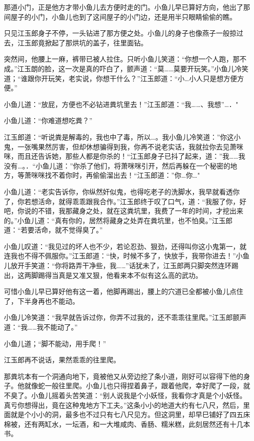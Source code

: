 \documentclass[12pt,oneside]{book}
\begin{document}
那道小门，正是他方才带小鱼儿去方便时走的门。小鱼儿早已算好方向，他出了那间屋子的小门，小鱼儿也到了这间屋子的小门边，还是用半只眼睛偷偷的瞧。

只见江玉郎身子不停，一头钻进了那方便之处。小鱼儿的身子也像燕子一般掠过去，江玉郎竟掀起了那烘坑的盖子，往里面钻。

突然间，他腰上一麻，裤带已被人拉住。只听小鱼儿笑道：``你想一个人跑，那不成。''江玉朗的脸，这一次是真的吓白了，颤声道：``莫\ldots\ldots 莫要开玩笑。''小鱼儿冷笑道；``谁跟你开玩笑，老实说，你想干什么？''江玉郎道：``小\ldots 小人只是想方便方便。''

小鱼儿道：``放屁，方便也不必钻进粪坑里去！''江玉郎道：``我\ldots\ldots、我想''\ldots．"

小鱼儿道：``你难道想吃粪？''

江玉郎道：``听说粪是解毒的，我也中了毒，所以\ldots。我小鱼儿冷笑道：''你这小鬼，一张嘴果然厉害，但却休想骗得到我，你再不说老实话，我就拉你去见萧咪咪，而且还告诉她，那些人都是你杀的！``江玉郎身子已抖了起来，道：''我\ldots\ldots 我没有\ldots。．``小鱼儿道：''你杀了他们，将萧咪咪引开，然后再躲在一个秘密的地方，等萧咪咪找不着你时，再偷偷溜出去！``江玉郎道：''你\ldots 你\ldots"

小鱼儿道：``老实告诉你，你纵然奸似鬼，也得吃老子的洗脚水，我早就看透你了，你若想活命，就得乖乖跟我合作。''江玉郎终于叹了口气，道：``我服了你，好吧，你说的不错，我那藏身之处，就在这粪坑里，我费了一年的时间，才挖出来的。''小鱼儿道：``真有你的，居然将藏身之处弄在粪坑里，也不怕臭。''江玉郎道：``若要活命，就不觉得臭了。''

小鱼儿叹道：``我见过的坏人也不少，若论忍劲、狠劲，还得叫你这小鬼第一，就连我也不得不佩服你。''江玉郎道：``快，时候不多了，快放手，我带你进去！''小鱼儿放开手笑道：``你将路弄干净些，我\ldots\ldots{}''话犹未了，江玉郎两只脚突然连环踢出，这两脚踢得当真是又准又狠，他看来本不似有这么高的武功。

可惜小鱼儿早已算好他有这一着，他脚再踢出，腰上的穴道已全都被小鱼儿点住了，下半身再也不能动。

小鱼儿冷笑道：``我早就告诉过你，你弄不过我的，还不乖乖往里爬。''江玉郎颤声道：``我\ldots\ldots 我不能动了。''

小鱼儿道；``脚不能动，用手爬！''

江玉郎再不说话，果然乖乖的往里爬。

那粪坑本有一个洞通向地下，竟被他又从旁边挖了条小道，刚好可以容得下他的身子。他就像蛇一般往里爬。小鱼儿也只得捏着鼻子，跟着他爬，幸好爬了一段，就不臭了。小鱼儿摇着头苦笑道：``别人说我是个小妖怪，我看你才真是个小妖怪。真亏你想得出，竟在这种鬼地方下工夫。''这条小小的地道大约有七八尺，然后，里面就是个小小的洞，最多也不过只有七八尺见方。但这洞里，却早巳铺好了四五床棉被，还有两缸水，一坛酒，和一大堆咸肉、香肠、糯米糕，此刻居然还有十几本书。
\end{document}
